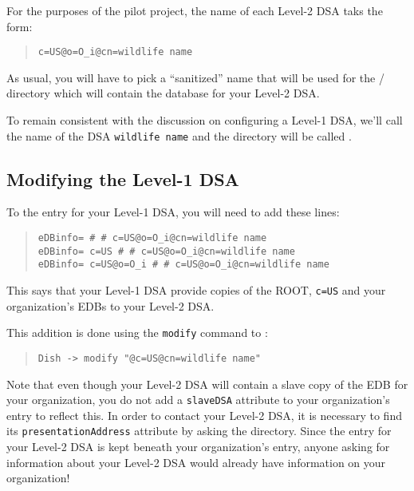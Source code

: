 For the purposes of the pilot project,
the name of each Level-2 DSA taks the form:
\begin{quote}\small\begin{verbatim}
c=US@o=O_i@cn=wildlife name
\end{verbatim}\end{quote}
As usual,
you will have to pick a ``sanitized'' name that will be used for the \unix/
directory which will contain the database for your Level-2 DSA.

To remain consistent with the discussion on configuring a Level-1 DSA,
we'll call the name of the DSA \verb"wildlife name" and the directory will be
called .

\subsection	{Modifying the Level-1 DSA}
To the entry for your Level-1 DSA,
you will need to add these lines:
\begin{quote}\small\begin{verbatim}
eDBinfo= # # c=US@o=O_i@cn=wildlife name
eDBinfo= c=US # # c=US@o=O_i@cn=wildlife name
eDBinfo= c=US@o=O_i # # c=US@o=O_i@cn=wildlife name
\end{verbatim}\end{quote}
This says that your Level-1 DSA provide copies of the ROOT, \verb"c=US" and
your organization's EDBs to your Level-2 DSA.

This addition is done using the \verb"modify" command to :
\begin{quote}\small\begin{verbatim}
Dish -> modify "@c=US@cn=wildlife name"
\end{verbatim}\end{quote}

Note that even though your Level-2 DSA will contain a slave copy of the EDB
for your organization,
you do not add a \verb"slaveDSA" attribute to your organization's entry to
reflect this.
In order to contact your Level-2 DSA,
it is necessary to find its \verb"presentationAddress" attribute by asking the
directory.
Since the entry for your Level-2 DSA is kept beneath your organization's
entry, anyone asking for information about your Level-2 DSA would already have
information on your organization!

